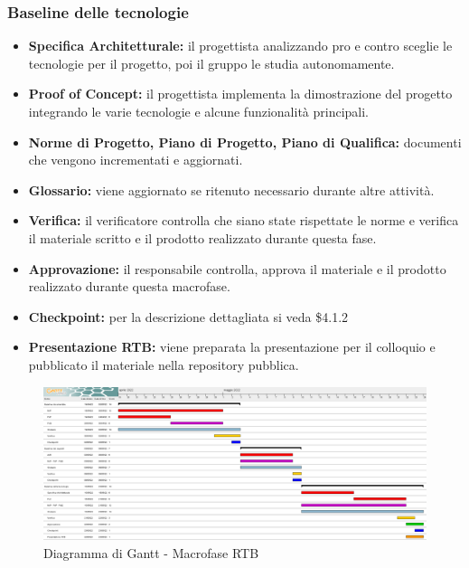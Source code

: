 \subsubsection{Baseline delle tecnologie}
\begin{itemize}
    \item \textbf{Specifica Architetturale:} il progettista analizzando pro e contro sceglie le tecnologie per il progetto, poi il gruppo le studia autonomamente.
    \item \textbf{Proof of Concept:} il progettista implementa la dimostrazione del progetto integrando le varie tecnologie e alcune funzionalità principali.
    \item \textbf{Norme di Progetto, Piano di Progetto, Piano di Qualifica:} documenti che vengono incrementati e aggiornati.
    \item \textbf{Glossario:} viene aggiornato se ritenuto necessario durante altre attività.
    \item \textbf{Verifica:} il verificatore controlla che siano state rispettate le norme e verifica il materiale scritto e il prodotto realizzato durante questa fase.
    \item \textbf{Approvazione:} il responsabile controlla, approva il materiale e il prodotto realizzato durante questa macrofase.
    \item \textbf{Checkpoint:} per la descrizione dettagliata si veda \$4.1.2
    \item \textbf{Presentazione RTB:} viene preparata la presentazione per il colloquio e pubblicato il materiale nella repository pubblica.
\end{itemize}


\begin{landscape}
	\begin{figure}
	\includegraphics[width=\linewidth]{images/preventivo/RTB-Gantt.png}
    \caption{Diagramma di Gantt - Macrofase RTB}
	\end{figure}
\end{landscape}